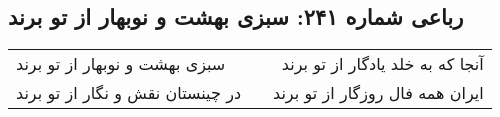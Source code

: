\begin{center}
\section*{رباعی شماره ۲۴۱: سبزی بهشت و نوبهار از تو برند}
\label{sec:sh241}
\begin{longtable}{l p{0.5cm} r}
سبزی بهشت و نوبهار از تو برند
&&
آنجا که به خلد یادگار از تو برند
\\
در چینستان نقش و نگار از تو برند
&&
ایران همه فال روزگار از تو برند
\\
\end{longtable}
\end{center}

